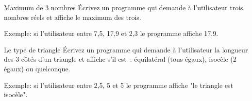 \documentclass[a4paper,11pt]{article}
\begin{document}
	\begin{Exercice}{Maximum de 3 nombres}
		\'Ecrivez un programme qui demande à l'utilisateur 
		trois nombres réels et affiche le maximum des trois.
		
		Exemple: si l'utilisateur entre 7,5, 17,9 et 2,3 le programme affiche 17,9. 
	\end{Exercice}

	\begin{Exercice}{Le type de triangle}
 		\'Ecrivez un programme qui demande à l'utilisateur 
		 la longueur des 3 côtés d'un triangle et affiche s'il est~: 
		 équilatéral (tous égaux), isocèle (2 égaux) ou quelconque.
		 
		 Exemple: si l'utilisateur entre 2,5, 5 et 5 le programme affiche "le triangle est isocèle". 
	\end{Exercice}
\end{document}
